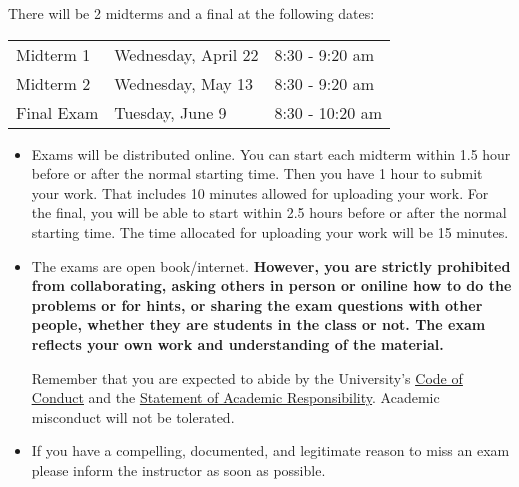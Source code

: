 \documentclass[11pt]{article}
\begin{document}
There will be 2 midterms and a final at the following dates:
\begin{center}
\begin{tabular}{l l l}
  Midterm 1 & Wednesday, April 22& 8:30 - 9:20 am\\
  Midterm 2 & Wednesday, May 13& 8:30 - 9:20 am\\
  Final Exam & Tuesday, June 9& 	8:30 - 10:20 am
\end{tabular}
\end{center}
\begin{itemize}
  \item Exams will be distributed online. You can start each midterm within 1.5 hour before or after the normal starting time. Then you have 1 hour to submit your work. That includes 10 minutes allowed for uploading your work.
  For the final, you will be able to start within 2.5 hours before or after the normal starting time.
The time allocated for uploading your work will be 15 minutes.
  \item The exams are open book/internet. \textbf{However, you are strictly prohibited from collaborating, asking others in person or oniline how to do the problems or for hints, or sharing the exam questions with other people, whether they are students in the class or not. The exam reflects your own work and understanding of the material.}



Remember that you are expected to abide by the University's \href{https://www.washington.edu/cssc/for-students/student-code-of-conduct/}{{\color{black}\underline{Code of Conduct}}} and the 
\href{https://depts.washington.edu/grading/pdf/AcademicResponsibility.pdf}{{\color{black}\underline{Statement of Academic Responsibility}}}.
Academic misconduct will not be tolerated.






  \item If you have a compelling, documented, and legitimate reason to miss an exam please inform the instructor as soon as possible.
\end{itemize}








\end{document}
